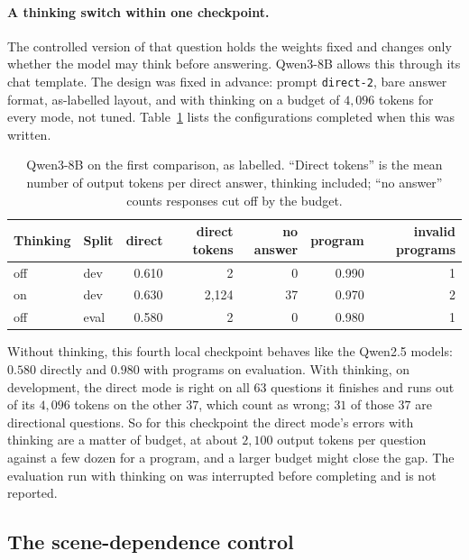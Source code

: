 \documentclass[11pt,a4paper]{article}
\newcommand{\code}[1]{\texttt{\small #1}}
\begin{document}
\paragraph{A thinking switch within one checkpoint.} The controlled version
of that question holds the weights fixed and changes only whether the model
may think before answering. Qwen3-8B allows this through its chat template.
The design was fixed in advance: prompt \code{direct-2}, bare answer format,
as-labelled layout, and with thinking on a budget of $4{,}096$ tokens for
every mode, not tuned. Table~\ref{tab:qwen3} lists the configurations
completed when this was written.

\begin{table}[ht]
\centering
\small
\begin{tabular}{llrrrrr}
\toprule
Thinking & Split & direct & direct tokens & no answer & program & invalid programs \\
\midrule
off & dev  & 0.610 & 2 & 0 & 0.990 & 1 \\
on  & dev  & 0.630 & 2{,}124 & 37 & 0.970 & 2 \\
off & eval & 0.580 & 2 & 0 & 0.980 & 1 \\
\bottomrule
\end{tabular}
\caption{Qwen3-8B on the first comparison, as labelled. ``Direct tokens'' is
the mean number of output tokens per direct answer, thinking included; ``no
answer'' counts responses cut off by the budget.}
\label{tab:qwen3}
\end{table}

Without thinking, this fourth local checkpoint behaves like the Qwen2.5
models: $0.580$ directly and $0.980$ with programs on evaluation. With
thinking, on development, the direct mode is right on all $63$ questions it
finishes and runs out of its $4{,}096$ tokens on the other $37$, which count
as wrong; $31$ of those $37$ are directional questions. So for this
checkpoint the direct mode's errors with thinking are a matter of budget, at
about $2{,}100$ output tokens per question against a few dozen for a program,
and a larger budget might close the gap. The evaluation run with thinking on
was interrupted before completing and is not reported.

\subsection{The scene-dependence control}
\label{sec:scene}
\end{document}
